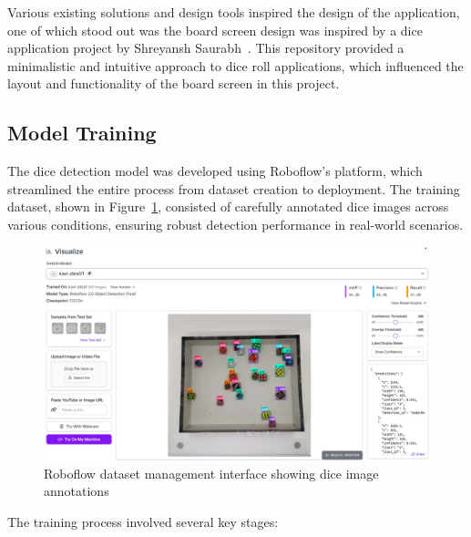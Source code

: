 Various existing solutions and design tools inspired the design of the application, one of which stood out was the board screen design was inspired by a dice application project by Shreyansh Saurabh~\cite{bib:binaryshrey}. This repository provided a minimalistic and intuitive approach to dice roll applications, which influenced the layout and functionality of the board screen in this project.

\subsection{Model Training}

The dice detection model was developed using Roboflow's platform, which streamlined the entire process from dataset creation to deployment. The training dataset, shown in Figure~\ref{fig:roboflow_dataset}, consisted of carefully annotated dice images across various conditions, ensuring robust detection performance in real-world scenarios.

\begin{figure}[ht!]
    \centering
    \includegraphics[width=\textwidth]{img/roboflow_dataset.jpg}
    \caption{Roboflow dataset management interface showing dice image annotations}
    \label{fig:roboflow_dataset}
\end{figure}

The training process involved several key stages:

